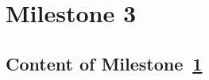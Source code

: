 


\chapter{Milestone 3} \label{cha:ml3}
    \section{Content of Milestone~\ref{cha:ml3}} 
        \label{sec:ml3_content}
    
    


